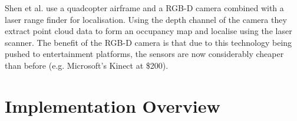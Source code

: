 \documentclass[]{article}
\begin{document}
{Shen et al. \cite{Shen2012} use a quadcopter airframe and a RGB-D camera combined with a laser range finder for localisation. Using the depth channel of the camera they extract point cloud data to form an occupancy map and localise using the laser scanner. The benefit of the RGB-D camera is that due to this technology being pushed to entertainment platforms, the sensors are now considerably cheaper than before (e.g. Microsoft's Kinect at \$200). 


\section{Implementation Overview}
\label{sub:implementation_overview}



	


}
\end{document}
